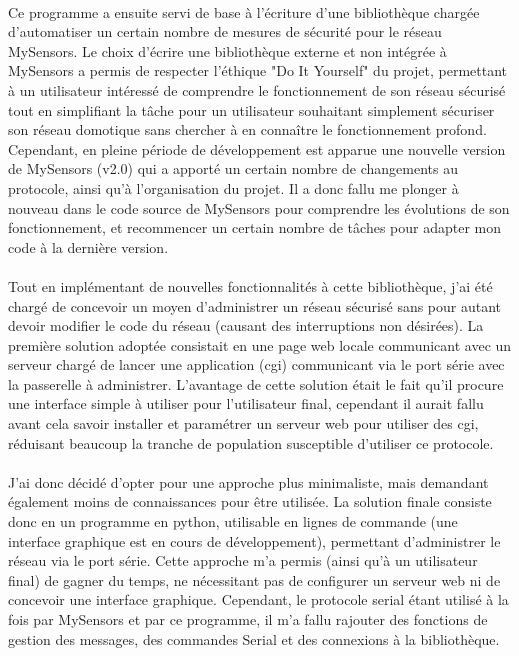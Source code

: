\documentclass[12 pt]{report}
\begin{document}
\paragraph{}Ce programme a ensuite servi de base à l'écriture d'une bibliothèque chargée d'automatiser un certain nombre de mesures de sécurité pour le réseau MySensors. Le choix d'écrire une bibliothèque externe et non intégrée à MySensors a permis de respecter l'éthique "Do It Yourself" du projet, permettant à un utilisateur intéressé de comprendre le fonctionnement de son réseau sécurisé tout en simplifiant la tâche pour un utilisateur souhaitant simplement sécuriser son réseau domotique sans chercher à en connaître le fonctionnement profond. Cependant, en pleine période de développement est apparue une nouvelle version de MySensors (v2.0) qui a apporté un certain nombre de changements au protocole, ainsi qu'à l'organisation du projet. Il a donc fallu me plonger à nouveau dans le code source de MySensors pour comprendre les évolutions de son fonctionnement, et recommencer un certain nombre de tâches pour adapter mon code à la dernière version.
\paragraph{}Tout en implémentant de nouvelles fonctionnalités à cette bibliothèque, j'ai été chargé de concevoir un moyen d'administrer un réseau sécurisé sans pour autant devoir modifier le code du réseau (causant des interruptions non désirées). La première solution adoptée consistait en une page web locale communicant avec un serveur chargé de lancer une application (cgi) communicant via le port série avec la passerelle à administrer. L'avantage de cette solution était le fait qu'il procure une interface simple à utiliser pour l'utilisateur final, cependant il aurait fallu avant cela savoir installer et paramétrer un serveur web pour utiliser des cgi, réduisant beaucoup la tranche de population susceptible d'utiliser ce protocole.
\paragraph{}J'ai donc décidé d'opter pour une approche plus minimaliste, mais demandant également moins de connaissances pour être utilisée. La solution finale consiste donc en un programme en python, utilisable en lignes de commande (une interface graphique est en cours de développement), permettant d'administrer le réseau via le port série. Cette approche m'a permis (ainsi qu'à un utilisateur final) de gagner du temps, ne nécessitant pas de configurer un serveur web ni de concevoir une interface graphique. Cependant, le protocole serial étant utilisé à la fois par MySensors et par ce programme, il m'a fallu rajouter des fonctions de gestion des messages, des commandes Serial et des connexions à la bibliothèque.
\end{document}
